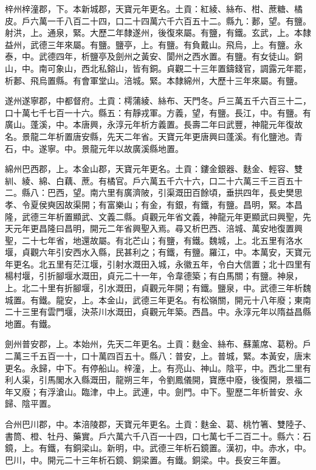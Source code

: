 \begin{pinyinscope}
 梓州梓潼郡，下。本新城郡，天寶元年更名。土貢：紅綾、絲布、柑、蔗糖、橘皮。戶六萬一千八百二十四，口二十四萬六千六百五十二。縣九：郪，望。有鹽。射洪，上。通泉，緊。大歷二年隸遂州，後復來屬。有鹽，有鐵。玄武，上。本隸益州，武德三年來屬。有鹽。鹽亭，上。有鹽。有負戴山。飛烏，上。有鹽。永泰，中。武德四年，析鹽亭及劍州之黃安、閬州之西水置。有鹽。有女徒山。銅山，中。南可象山，西北私鎔山，皆有銅。貞觀二十三年置鑄錢官，調露元年罷，析郪、飛烏置縣。有會軍堂山。涪城。緊。本隸綿州，大歷十三年來屬。有鹽。



 遂州遂寧郡，中都督府。土貢：樗蒲綾、絲布、天門冬。戶三萬五千六百三十二，口十萬七千七百一十六。縣五：有靜戎軍。方義，望，有鹽。長江，中。有鹽。有廣山。蓬溪，中。本唐興，永淳元年析方義置。長壽二年曰武豐，神龍元年復故名。景龍二年析置唐安縣，先天二年省。天寶元年更唐興曰蓬溪。有化鹽池。青石，中。遂寧。中。景龍元年以故廣溪縣地置。



 綿州巴西郡，上。本金山郡，天寶元年更名。土貢：鏤金銀器、麩金、輕容、雙紃、綾、綿、白藕、蔗。有橘官。戶六萬五千六十六，口二十六萬三千三百五十二。縣八：巴西，望。南六里有廣濟陂，引渠溉田百餘頃，垂拱四年，長史樊思孝、令夏侯奭因故渠開；有富樂山；有金，有銀，有鐵，有鹽。昌明，緊。本昌隆，武德三年析置顯武、文義二縣。貞觀元年省文義，神龍元年更顯武曰興聖，先天元年更昌隆曰昌明，開元二年省興聖入焉。尋又析巴西、涪城、萬安地復置興聖，二十七年省，地還故屬。有北芒山；有鹽，有鐵。魏城，上。北五里有洛水堰，貞觀六年引安西水入縣，民甚利之；有鐵，有鹽。羅江，中。本萬安，天寶元年更名。北五里有茫江堰，引射水溉田入城，永徽五年，令白大信置；北十四里有楊村堰，引折腳堰水溉田，貞元二十一年，令韋德築；有白馬關；有鹽。神泉，上。北二十里有折腳堰，引水溉田，貞觀元年開；有鐵。鹽泉，中。武德三年析魏城置。有鐵。龍安，上。本金山，武德三年更名。有松嶺關，開元十八年廢；東南二十三里有雲門堰，決茶川水溉田，貞觀元年築。西昌。中。永淳元年以隋益昌縣地置。有鐵。



 劍州普安郡，上。本始州，先天二年更名。土貢：麩金、絲布、蘇薰席、葛粉。戶二萬三千五百一十，口十萬四百五十。縣八：普安，上。普城，緊。本黃安，唐末更名。永歸，中下。有停船山。梓潼，上。有亮山、神山。陰平，中。西北二里有利人渠，引馬閣水入縣溉田，龍朔三年，令劉鳳儀開，寶應中廢，後復開，景福二年又廢；有浮滄山。臨津，中上。武連，中。劍門。中下。聖歷二年析普安、永歸、陰平置。



 合州巴川郡，中。本涪陵郡，天寶元年更名。土貢：麩金、葛、桃竹箸、雙陸子、書筒、橙、牡丹、藥實。戶六萬六千八百一十四，口七萬七千二百二十。縣六：石鏡，上。有鐵，有銅梁山。新明，中。武德三年析石鏡置。漢初，中。赤水，中。巴川，中。開元二十三年析石鏡、銅梁置。有鐵。銅梁。中。長安三年置。




\end{pinyinscope}
